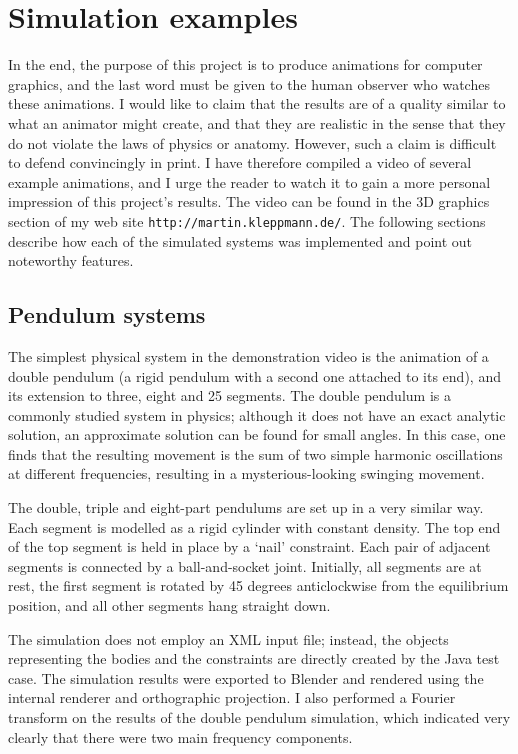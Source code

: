 \section{Simulation examples}

In the end, the purpose of this project is to produce animations for computer graphics, and the
last word must be given to the human observer who watches these animations. I would like to claim
that the results are of a quality similar to what an animator might create, and that they are
realistic in the sense that they do not violate the laws of physics or anatomy. However, such a
claim is difficult to defend convincingly in print. I have therefore compiled a video of several
example animations, and I urge the reader to watch it to gain a more personal impression of this
project's results. The video can be found in the 3D graphics section of my web site
\texttt{http://martin.kleppmann.de/}. The following sections describe how each of the simulated
systems was implemented and point out noteworthy features.

\subsection{Pendulum systems}

The simplest physical system in the demonstration video is
the animation of a double pendulum (a rigid pendulum with a second one
attached to its end), and its extension to three, eight and 25 segments. The double pendulum is
a commonly studied system in physics; although it does not have an exact analytic solution, an
approximate solution can be found for small angles. In this case, one finds that the resulting
movement is the sum of two simple harmonic oscillations at different frequencies, resulting in
a mysterious-looking swinging movement.

The double, triple and eight-part pendulums are set up in a very similar way. Each segment is
modelled as a rigid cylinder with constant density. The top end of the top segment is held in
place by a `nail' constraint. Each pair of adjacent segments is connected by a ball-and-socket
joint. Initially, all segments are at rest, the first segment is rotated by 45 degrees
anticlockwise from the equilibrium position, and all other segments hang straight down.

The simulation does not employ an XML input file; instead, the objects representing the bodies
and the constraints are directly created by the Java test case. The simulation results were
exported to Blender and rendered using the internal renderer and orthographic projection.
I also performed a Fourier transform on the results of the double pendulum simulation, which
indicated very clearly that there were two main frequency components.

